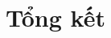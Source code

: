 \documentclass[12pt]{extreport}
\begin{document}
\subsection{}

\subsection{}

\chapter{Tổng kết}


\newpage
\begin{thebibliography}{12}

\end{thebibliography}
\end{document}
